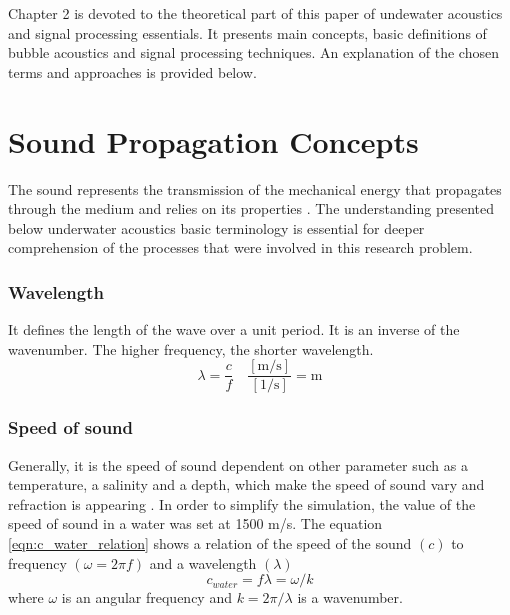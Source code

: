 Chapter 2 is devoted to the theoretical part of this paper of undewater acoustics and signal processing essentials. It presents main concepts, basic definitions of bubble acoustics and signal processing techniques. An explanation of the chosen terms and approaches is provided below.

\section{Sound Propagation Concepts}

The sound represents the transmission of the mechanical energy that  propagates through the medium and relies on its properties \cite[p.1]{leighton_acoustic_2012}. The understanding presented below underwater acoustics basic terminology is essential for deeper comprehension of the processes that were involved in this research problem.
\subsubsection{Wavelength}
It defines the length of the wave over a unit period. It is an inverse of the wavenumber. The higher frequency, the shorter wavelength.
\begin{equation}
    \lambda = \frac{c}{f} \quad \frac{[\text{m/s}]}{[\text{1/s}]} = \text{m}
\end{equation}

\subsubsection{Speed of sound}
Generally, it is the speed of sound dependent on other parameter such as a temperature, a salinity and a depth, which make the speed of sound vary and refraction is appearing \cite[p. 28]{hodges_underwater_2011}. In order to simplify the simulation, the value of the speed of sound in a water was set at 1500 m/s. 
The equation \ref{eqn:c_water_relation} shows a relation of the speed of the sound $(c)$ to frequency $(\omega = 2\pi f)$ and a wavelength $(\lambda)$  
\begin{equation}
    c_{water} = f\lambda = \omega / k
    \label{eqn:c_water_relation}
\end{equation}
where $\omega$ is an angular frequency and $k=2\pi/\lambda$ is a wavenumber.
